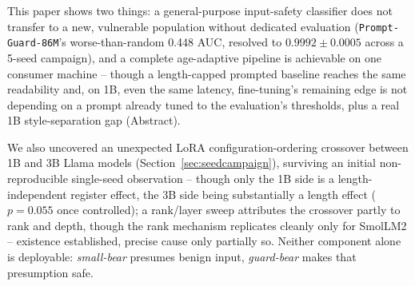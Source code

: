 \documentclass[pdflatex,sn-mathphys-num]{sn-jnl-official}%
\begin{document}
This paper shows two things: a general-purpose input-safety classifier does not transfer to a new, vulnerable population without dedicated evaluation (\texttt{Prompt-Guard-86M}'s worse-than-random 0.448 AUC, resolved to $0.9992\pm0.0005$ across a 5-seed campaign), and a complete age-adaptive pipeline is achievable on one consumer machine -- though a length-capped prompted baseline reaches the same readability and, on 1B, even the same latency, fine-tuning's remaining edge is not depending on a prompt already tuned to the evaluation's thresholds, plus a real 1B style-separation gap (Abstract).

We also uncovered an unexpected LoRA configuration-ordering crossover between 1B and 3B Llama models (Section~\ref{sec:seedcampaign}), surviving an initial non-reproducible single-seed observation -- though only the 1B side is a length-independent register effect, the 3B side being substantially a length effect ($p=0.055$ once controlled); a rank/layer sweep attributes the crossover partly to rank and depth, though the rank mechanism replicates cleanly only for SmolLM2 -- existence established, precise cause only partially so. Neither component alone is deployable: \textit{small-bear} presumes benign input, \textit{guard-bear} makes that presumption safe.
\end{document}
